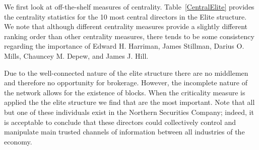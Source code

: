 We first look at off-the-shelf measures of centrality. Table~\ref{CentralElite} provides the centrality statistics for the 10 most central directors in the Elite structure. We note that although different centrality measures provide a slightly different ranking order than other centrality measures, there tends to be some consistency regarding the importance of Edward H. Harriman, James Stillman, Darius O. Mills, Chauncey M. Depew, and James J. Hill.

\begin{table}[t]
\caption{Centrality statistics of 10 most central directors in the elite structure.}
\label{CentralElite}
\end{table}

Due to the well-connected nature of the elite structure there are no middlemen and therefore no opportunity for brokerage. However, the incomplete nature of the network allows for the existence of blocks. When the criticality measure is applied the the elite structure we find that are the most important. Note that all but one of these individuals exist in the Northern Securities Company; indeed, it is acceptable to conclude that these directors could collectively control and manipulate main trusted channels of information between all industries of the economy.

